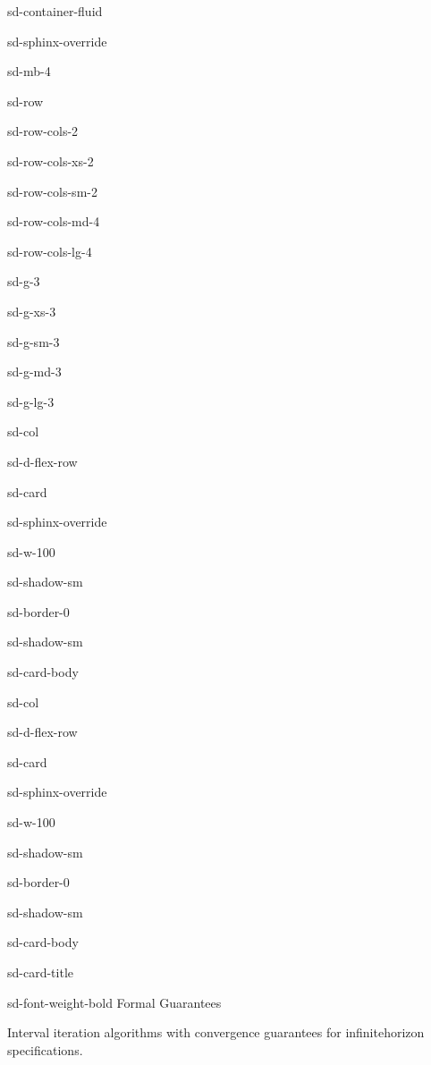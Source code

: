 \documentclass[a4paper,10pt,english]{sphinxmanual}
\begin{document}
\begin{sphinxuseclass}{sd-container-fluid}
\begin{sphinxuseclass}{sd-sphinx-override}
\begin{sphinxuseclass}{sd-mb-4}
\begin{sphinxuseclass}{sd-row}
\begin{sphinxuseclass}{sd-row-cols-2}
\begin{sphinxuseclass}{sd-row-cols-xs-2}
\begin{sphinxuseclass}{sd-row-cols-sm-2}
\begin{sphinxuseclass}{sd-row-cols-md-4}
\begin{sphinxuseclass}{sd-row-cols-lg-4}
\begin{sphinxuseclass}{sd-g-3}
\begin{sphinxuseclass}{sd-g-xs-3}
\begin{sphinxuseclass}{sd-g-sm-3}
\begin{sphinxuseclass}{sd-g-md-3}
\begin{sphinxuseclass}{sd-g-lg-3}
\begin{sphinxuseclass}{sd-col}
\begin{sphinxuseclass}{sd-d-flex-row}
\begin{sphinxuseclass}{sd-card}
\begin{sphinxuseclass}{sd-sphinx-override}
\begin{sphinxuseclass}{sd-w-100}
\begin{sphinxuseclass}{sd-shadow-sm}
\begin{sphinxuseclass}{sd-border-0}
\begin{sphinxuseclass}{sd-shadow-sm}
\begin{sphinxuseclass}{sd-card-body}
\end{sphinxuseclass}
\end{sphinxuseclass}
\end{sphinxuseclass}
\end{sphinxuseclass}
\end{sphinxuseclass}
\end{sphinxuseclass}
\end{sphinxuseclass}
\end{sphinxuseclass}
\end{sphinxuseclass}
\begin{sphinxuseclass}{sd-col}
\begin{sphinxuseclass}{sd-d-flex-row}
\begin{sphinxuseclass}{sd-card}
\begin{sphinxuseclass}{sd-sphinx-override}
\begin{sphinxuseclass}{sd-w-100}
\begin{sphinxuseclass}{sd-shadow-sm}
\begin{sphinxuseclass}{sd-border-0}
\begin{sphinxuseclass}{sd-shadow-sm}
\begin{sphinxuseclass}{sd-card-body}
\begin{sphinxuseclass}{sd-card-title}
\begin{sphinxuseclass}{sd-font-weight-bold} Formal Guarantees
\end{sphinxuseclass}
\end{sphinxuseclass}
\sphinxAtStartPar
Interval iteration algorithms with convergence guarantees
for infinite\sphinxhyphen{}horizon specifications.


\end{sphinxuseclass}
\end{sphinxuseclass}
\end{sphinxuseclass}
\end{sphinxuseclass}
\end{sphinxuseclass}
\end{sphinxuseclass}
\end{sphinxuseclass}
\end{sphinxuseclass}
\end{sphinxuseclass}
\end{sphinxuseclass}
\end{sphinxuseclass}
\end{sphinxuseclass}
\end{sphinxuseclass}
\end{sphinxuseclass}
\end{sphinxuseclass}
\end{sphinxuseclass}
\end{sphinxuseclass}
\end{sphinxuseclass}
\end{sphinxuseclass}
\end{sphinxuseclass}
\end{sphinxuseclass}
\end{sphinxuseclass}
\end{sphinxuseclass}
\end{document}
